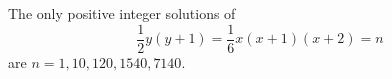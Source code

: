 \begin{proposition}
    The only positive integer solutions of
\[
    \frac{1}{2}y(y+1)=\frac{1}{6}x(x+1)(x+2)=n
\]
    are $n=1,10,120,1540,7140$.
\end{proposition}
